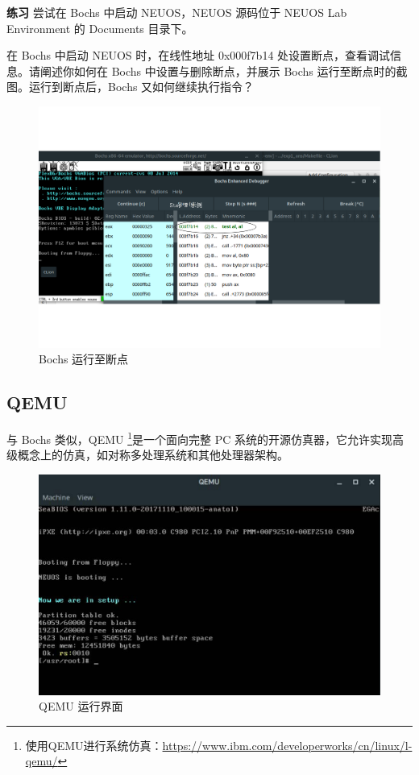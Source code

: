 \begin{mdframed}[hidealllines=true,backgroundcolor=gray!20]
\textbf{练习 } 尝试在 Bochs 中启动 NEUOS，NEUOS 源码位于 NEUOS Lab Environment 的 Documents 目录下。

在 Bochs 中启动 NEUOS 时，在线性地址 0x000f7b14 处设置断点，查看调试信息。请阐述你如何在 Bochs 中设置与删除断点，并展示 Bochs 运行至断点时的截图。运行到断点后，Bochs 又如何继续执行指令？
\end{mdframed}

\begin{figure}[htbp]
    \centering
    \includegraphics[width=\textwidth]{img/Bochs运行至断点.pdf}
    \caption{Bochs 运行至断点}
    \label{fig:Bochs 运行至断点}
\end{figure}

\subsection{QEMU}

与 Bochs 类似，QEMU \footnote{使用QEMU进行系统仿真：\url{https://www.ibm.com/developerworks/cn/linux/l-qemu/}}是一个面向完整 PC 系统的开源仿真器，它允许实现高级概念上的仿真，如对称多处理系统和其他处理器架构。

\begin{figure}[htbp]
    \centering
    \includegraphics[width=\textwidth]{img/QEMU运行界面.pdf}
    \caption{QEMU 运行界面}
    \label{fig:QEMU 运行界面}
\end{figure}

